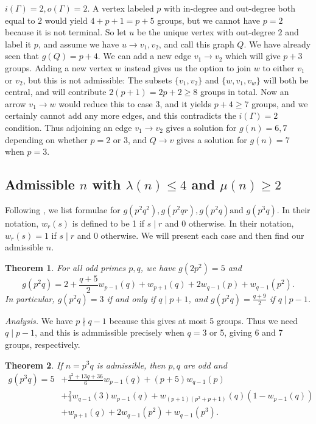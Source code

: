 \documentclass[draft]{article}
\theoremstyle{plain}
\newtheorem{fact}{Theorem}[section]
\theoremstyle{definition}
\begin{document}
 $i(\Gamma) = 2, o(\Gamma) = 2$. A vertex labeled $p$ with in-degree and out-degree both equal to $2$ would yield $4 + p + 1 = p + 5$ groups, but we cannot have $p = 2$ because it is not terminal. So let $u$ be the unique vertex with out-degree $2$ and label it $p$, and assume we have $u \rightarrow v_1, v_2$, and call this graph $Q$. We have already seen that $g(Q) = p + 4$. We can add a new edge $v_1 \rightarrow v_2$ which will give $p + 3$ groups. Adding a new vertex $w$ instead gives us the option to join $w$ to either $v_1$ or $v_2$, but this is not admissible: The subsets $\{v_1, v_2\}$ and $\{w, v_1, v_w\}$ will both be central, and will contribute $2(p + 1) = 2p + 2 \ge 8$ groups in total. Now an arrow $v_1 \rightarrow w$ would reduce this to case 3, and it yields $p + 4 \ge 7$ groups, and we certainly cannot add any more edges, and this contradicts the $i(\Gamma) = 2$ condition. Thus adjoining an edge $v_1 \rightarrow v_2$ gives a solution for $g(n) = 6, 7$ depending on whether $p = 2$ or $3$, and $Q \rightarrow v$ gives a solution for $g(n) = 7$ when $p = 3$. 

\subsection{Admissible $n$ with $\lambda(n) \le 4$ and $\mu(n) \ge 2$}
Following {\cite{bettinafour1}}, we list formulae for $g(p^2 q^2), g(p^2 q r), g(p^2 q) \text{and } g(p^3 q).$ In their notation, $w_r(s)$ is defined to be 1 if $s \mid r$ and 0 otherwise. In their notation, $w_r(s) = 1$ if $s \mid r$ and 0 otherwise. We will present each case and then find our admissible $n.$


\begin{fact}
	For all odd primes $p, q$, we have $g(2p^2) = 5$ and \[g(p^2 q) = 2 + \frac{q + 5}{2} w_{p - 1}(q) + w_{p + 1}(q) + 2w_{q - 1}(p) + w_{q - 1}(p^2).\] In particular, $g(p^2 q) = 3$ if and only if $q \mid p + 1$, and $g(p^2 q) = \frac{q + 9}{2}$ if $q \mid p - 1$.
\end{fact}

\textit{Analysis.} We have $p \nmid q - 1$ because this gives at most 5 groups. Thus we need $q \mid p - 1$, and this is admmissible precisely when $q = 3$ or 5, giving 6 and 7 groups, respectively.

\begin{fact}
	If $n = p^3 q$ is admissible, then $p, q$ are odd and
	$$\begin{aligned}
		g(p^3 q) = 5 &+ \frac{q^2 + 13q + 36}{6} w_{p - 1}(q) + (p + 5) w_{q - 1}(p) \\
		&+ \frac{2}{3} w_{q - 1}(3)w_{p - 1}(q) + w_{(p + 1)(p^2 + p + 1)}(q) (1 - w_{p - 1}(q)) \\
		&+ w_{p + 1}(q) + 2 w_{q - 1}(p^2) + w_{q - 1}(p^3).
	\end{aligned}$$
\end{fact}
\end{document}
